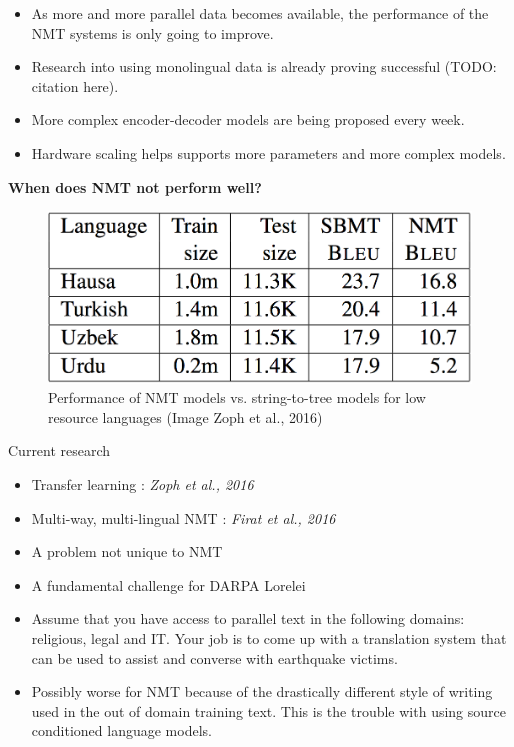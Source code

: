 \documentclass[landscape]{jhuslides3C}
\begin{document}
\begin{itemize}
\item As more and more parallel data becomes available, the performance of the NMT systems is only going to improve.
\item Research into using monolingual data is already proving successful (TODO: citation here).
\item More complex encoder-decoder models are being proposed every week.
\item Hardware scaling helps supports more parameters and more complex models.
\end{itemize}
\textbf{When does NMT not perform well?}

\begin{figure}
\begin{center}
\includegraphics[scale=0.5]{images/low-res.png}
\caption{Performance of NMT models vs. string-to-tree models for low resource languages ({\tiny Image Zoph et al., 2016})}
\end{center}
\end{figure}
Current research
\begin{itemize}
\item Transfer learning : \textit{Zoph et al., 2016}
\item Multi-way, multi-lingual NMT : \textit{Firat et al., 2016}
\end{itemize}

\begin{itemize}
\item A problem not unique to NMT
\item A fundamental challenge for DARPA Lorelei
\item Assume that you have access to parallel text in the following domains: religious, legal and IT. Your job is to come up with a translation system that can be used to assist and converse with earthquake victims.
\item Possibly worse for NMT because of the drastically different style of writing used in the out of domain training text. This is the trouble with using source conditioned language models.
\end{itemize}
\end{document}

